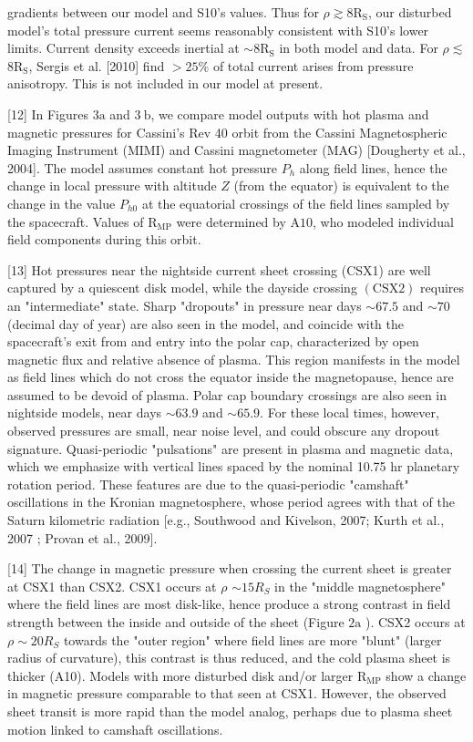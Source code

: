\documentclass[10pt]{article}
\begin{document}
gradients between our model and S10's values. Thus for $\rho \gtrsim 8 \mathrm{R}_{\mathrm{S}}$, our disturbed model's total pressure current seems reasonably consistent with S10's lower limits. Current density exceeds inertial at $\sim 8 \mathrm{R}_{\mathrm{S}}$ in both model and data. For $\rho \lesssim$ $8 \mathrm{R}_{\mathrm{S}}$, Sergis et al. [2010] find $>25 \%$ of total current arises from pressure anisotropy. This is not included in our model at present.

[12] In Figures $3 \mathrm{a}$ and $3 \mathrm{~b}$, we compare model outputs with hot plasma and magnetic pressures for Cassini's Rev 40 orbit from the Cassini Magnetospheric Imaging Instrument (MIMI) and Cassini magnetometer (MAG) [Dougherty et al., 2004]. The model assumes constant hot pressure $P_{h}$ along field lines, hence the change in local pressure with altitude $Z$ (from the equator) is equivalent to the change in the value $P_{h 0}$ at the equatorial crossings of the field lines sampled by the spacecraft. Values of $\mathrm{R}_{\mathrm{MP}}$ were determined by $\mathrm{A} 10$, who modeled individual field components during this orbit.

[13] Hot pressures near the nightside current sheet crossing (CSX1) are well captured by a quiescent disk model, while the dayside crossing $(\mathrm{CSX} 2)$ requires an "intermediate" state. Sharp "dropouts" in pressure near days $\sim 67.5$ and $\sim 70$ (decimal day of year) are also seen in the model, and coincide with the spacecraft's exit from and entry into the polar cap, characterized by open magnetic flux and relative absence of plasma. This region manifests in the model as field lines which do not cross the equator inside the magnetopause, hence are assumed to be devoid of plasma. Polar cap boundary crossings are also seen in nightside models, near days $\sim 63.9$ and $\sim 65.9$. For these local times, however, observed pressures are small, near noise level, and could obscure any dropout signature. Quasi-periodic "pulsations" are present in plasma and magnetic data, which we emphasize with vertical lines spaced by the nominal 10.75 hr planetary rotation period. These features are due to the quasi-periodic "camshaft" oscillations in the Kronian magnetosphere, whose period agrees with that of the Saturn kilometric radiation [e.g., Southwood and Kivelson, 2007; Kurth et al., 2007 ; Provan et al., 2009].

[14] The change in magnetic pressure when crossing the current sheet is greater at CSX1 than CSX2. CSX1 occurs at $\rho$ $\sim 15 R_{S}$ in the "middle magnetosphere" where the field lines are most disk-like, hence produce a strong contrast in field strength between the inside and outside of the sheet (Figure $2 \mathrm{a}$ ). CSX2 occurs at $\rho \sim 20 R_{S}$ towards the "outer region" where field lines are more "blunt" (larger radius of curvature), this contrast is thus reduced, and the cold plasma sheet is thicker (A10). Models with more disturbed disk and/or larger $\mathrm{R}_{\mathrm{MP}}$ show a change in magnetic pressure comparable to that seen at CSX1. However, the observed sheet transit is more rapid than the model analog, perhaps due to plasma sheet motion linked to camshaft oscillations.
\end{document}

